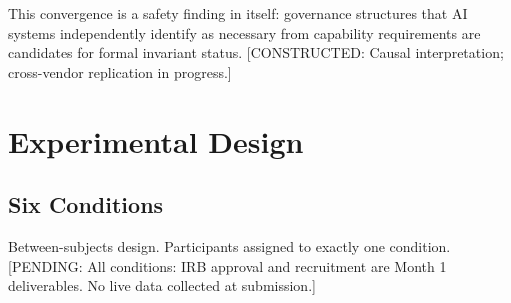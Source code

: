 \documentclass{article}
\newcommand{\pending}[1]{\textcolor{pendingred}{[PENDING: #1]}}
\newcommand{\constructed}[1]{\textcolor{pendingred}{[CONSTRUCTED: #1]}}
\begin{document}
This convergence is a safety finding in itself: governance structures that AI
systems independently identify as necessary from capability requirements are
candidates for formal invariant status. \constructed{Causal interpretation;
cross-vendor replication in progress.}

\section{Experimental Design}
\label{sec:experiments}

\subsection{Six Conditions}

Between-subjects design. Participants assigned to exactly one condition.
\pending{All conditions: IRB approval and recruitment are Month 1 deliverables.
No live data collected at submission.}
\end{document}
